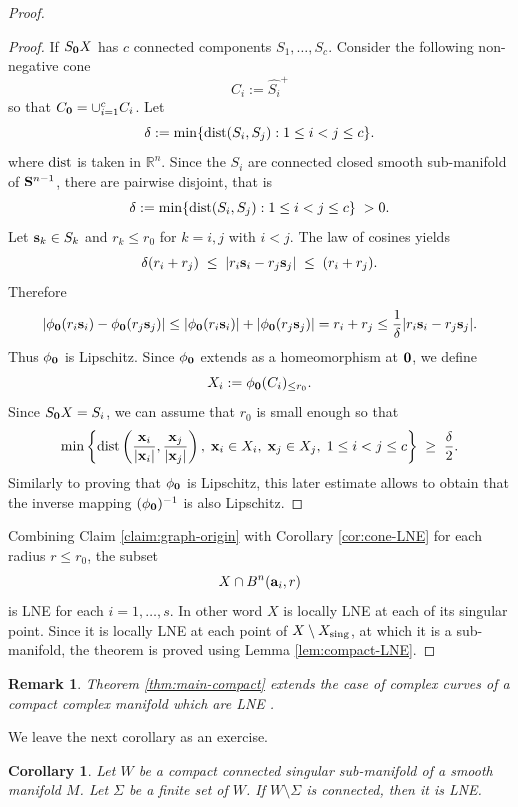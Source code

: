 \documentclass[11pt]{amsart}
\newtheorem{corollary}[theorem]{Corollary}
\newtheorem{remark}[theorem]{Remark}
\newcommand{\field}[1]{\mathbb{#1}}
\newcommand{\R}{\field{R}}
\newcommand{\wh}[1]{\widehat{#1}}
\newcommand{\ba}{{\bf a}}
\newcommand{\bbo}{{\bf 0}}
\newcommand{\bs}{{\bf s}}
\newcommand{\bS}{{\bf S}}
\newcommand{\bx}{{\bf x}}
\newcommand{\dist}{{\rm dist}}
\newcommand{\dlt}{{\delta}}
\newcommand{\Rn}{{\R^n}}
\newcommand{\sing}{{\rm sing}}
\numberwithin{equation}{section}
\numberwithin{equation}{section}
\begin{document}
\begin{proof}
\begin{proof}
			\medskip
			If $S_\bbo X$ has $c$ connected components $S_1,\ldots,S_c$. Consider
			the following non-negative cone
			$$
			C_i := \wh{S_i}^+
			$$
			so that $C_\bbo = \cup_{i=1}^c C_i$. Let 
			$$
			\dlt := \min\{\dist(S_i,S_j) : 1\leq i < j\leq c\}.
			$$
			where $\dist$ is taken in $\Rn$. Since the $S_i$ are connected closed
			smooth sub-manifold of $\bS^{n-1}$, there are pairwise disjoint, that is 
			$$
			\dlt := \min\{\dist(S_i,S_j) : 1\leq i < j\leq c\} \; > 0.
			$$
			Let $\bs_k \in S_k$ and $r_k \leq r_0$ for $k=i,j$ with $i<j$.
The law of cosines yields 
			$$
			\dlt (r_i + r_j) \; \leq \; |r_i\bs_i - r_j\bs_j| \; \leq \; (r_i + r_j).
			$$
			Therefore 
			$$
			|\phi_\bbo (r_i\bs_i) - \phi_\bbo (r_j\bs_j)| \leq |\phi_\bbo (r_i\bs_i)| + |\phi_\bbo (r_j\bs_j)| = r_i + r_j
			\leq \frac{1}{\dlt} |r_i\bs_i - r_j\bs_j|.
			$$
			Thus $\phi_\bbo$ is Lipschitz.
			Since $\phi_\bbo$ extends as a homeomorphism at $\bbo$, we define
			$$
			X_i := \phi_\bbo (C_i)_{\leq r_0}.
			$$
			\medskip
			Since $S_\bbo X = S_i$, we can assume that $r_0$ is small 
			enough so that 
			$$
			\min\left\{\dist\left(\frac{\bx_i}{|\bx_i|}, \frac{\bx_j}{|\bx_j|} \right), 
			\; \bx_i \in X_i, \; \bx_j \in X_j, \; 
			1 \leq  i < j \leq c \right\} \; \geq \; \frac{\dlt}{2}.
			$$
			Similarly to proving that $\phi_\bbo$ is Lipschitz, this later estimate 
			allows to obtain that the inverse mapping $(\phi_\bbo)^{-1}$ is also Lipschitz.
		\end{proof}
\noindent
		Combining  Claim \ref{claim:graph-origin} with Corollary \ref{cor:cone-LNE} 
		for each radius $r\leq r_0$, the subset
		$$
		X\cap B^n(\ba_i,r)
		$$ 
		is LNE for each $i=1,\ldots,s$. In other word $X$ is locally LNE at each
		of its singular point. Since it is locally LNE at each point of
		$X\setminus X_\sing$, at which it is a sub-manifold, the theorem is proved
		using Lemma \ref{lem:compact-LNE}.
	\end{proof}
	\begin{remark}
		Theorem \ref{thm:main-compact} extends the case of complex curves of a compact complex manifold which are LNE \cite[Section 4]{CoGrMi1}.
	\end{remark}
%
%
We leave the next corollary as an exercise.
%
%
\begin{corollary}\label{cor:conic-epointed}
Let $W$ be a compact connected singular sub-manifold of a smooth manifold
$M$. Let $\Sigma$ be a finite set of $W$. If $W\setminus \Sigma$ is connected, then 
it is LNE.
\end{corollary}
	
\end{document}
